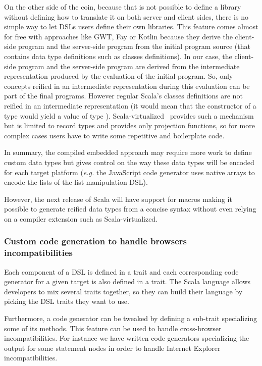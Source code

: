 \documentclass[american,english,runningheads]{llncs}
\newcommand{\eg}{\emph{e.g.}}
\begin{document}
On the other side of the coin, because that is not possible to define a library without defining how to translate it
on both server and client sides, there is no simple way to let DSLs users define their own libraries. This feature
comes almost for free with approaches like GWT, Fay or Kotlin because they derive the client-side program and the
server-side program from the initial program source (that contains data type definitions such as classes
definitions). In our case, the client-side program and the server-side program are derived from the intermediate
representation produced by the evaluation of the initial program. So, only concepts reified in an intermediate
representation during this evaluation can be part of the final programs. However regular Scala’s classes definitions
are not reified in an intermediate representation (it would mean that the constructor of a type  would yield
a value of type ). Scala-virtualized~\cite{Moors12_Virtualized} provides such a mechanism but is 
limited to record types and provides only projection functions, so for more complex cases users have to write some
repetitive and boilerplate code.

In summary, the compiled embedded approach may require more work to define custom data types but gives control on
the way these data types will be encoded for each target platform (\eg{} the JavaScript code generator uses native
arrays to encode the lists of the list manipulation DSL).

However, the next release of Scala will have support for macros making it possible to generate reified data types
from a concise syntax without even relying on a compiler extension such as Scala-virtualized.

\subsubsection{Custom code generation to handle browsers incompatibilities}

Each component of a DSL is defined in a trait and each corresponding code generator for a given target is also
defined in a trait. The Scala language allows developers to mix several traits together, so they can build their
language by picking the DSL traits they want to use.

Furthermore, a code generator can be tweaked by defining a sub-trait specializing some of its methods. This feature
can be used to handle cross-browser incompatibilities. For instance we have written code generators specializing the
output for some statement nodes in order to handle Internet Explorer incompatibilities.
\end{document}
